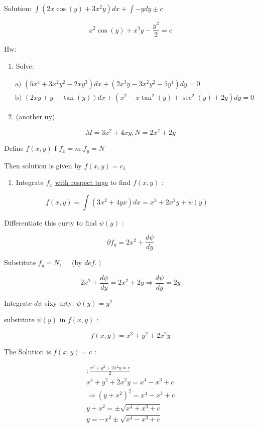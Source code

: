 \documentclass[12pt, a4paper]{article}
\begin{document}
Solution: $\int\left(2 x \cos(y)+3 x^2 y\right) d x+\int-y d y \pm c$

$$
	x^2 \cos(y)+x^{3} y-\frac{y^2}{2}=c
$$

Hw:

\begin{enumerate}
	\item Solve:
\end{enumerate}

$$
	\begin{aligned}
		 & \text{ a) }\left(5 x^{4}+3 x^2 y^2-2 x y^{3}\right) d x+\left(2 x^{3} y-3 x^2 y^2-5 y^{4}\right) d y=0 \\
		 & \text{ b) }(2 x y+y-\tan(y)) d x+\left(x^2 -x \tan ^{2}(y)+\sec ^{2}(y)+2 y\right) d y=0
	\end{aligned}
$$

\begin{enumerate}
	\setcounter{enumi}{1}
	\item (another uy).
\end{enumerate}

$$
	M=3 x^2 +4 x y, N=2 x^2 +2 y
$$

Define $f(x, y)$ f $f_{x}=m . f_{y}=N$

Then solution is given by $f(x, y)=c_{1}$

\begin{enumerate}
	\item Integrate $f_{x}$ \href{http://with respect toge}{with respect toge} to find $f(x, y)$ :
\end{enumerate}

$$
	f(x, y)=\int\left(3 x^2 +4 y x\right) d x=x^{3}+2 x^2 y+\psi(y) \quad
$$

Differentiate this curty to find $\psi(y)$ :

$$
	\partial f_{y}=2 x^2 +\frac{d \psi}{d y}
$$

Substitute $f_{y}=N, \quad$ (by $\left.d e f.\right)$

$$
	2 x^2 +\frac{d \psi}{d y}=2 x^2 +2 y \Rightarrow \frac{d \psi}{d y}=2 y
$$

Integrate $d \psi$ sixy urty: $\psi(y)=y^2$

substitute $\psi(y)$ in $f(x, y)$ :

$$
	f(x, y)=x^{3}+y^2+2 x^2 y
$$

The Solution is $f(x, y)=c$ :

$$
	\begin{gathered}
		: \frac{x^{3}+y^2+2 x^2 y=c}{2} \\
		x^{4}+y^2+2 x^2 y=x^{4}-x^{3}+c \\
		\Rightarrow\left(y+x^2 \right)^{2}=x^{4}-x^{3}+c \\
		y+x^2 = \pm \sqrt{x^{4}+x^{3}+c} \\
		y=-x^2 \pm \sqrt{x^{4}-x^{3}+c}
	\end{gathered}
$$
\end{document}
